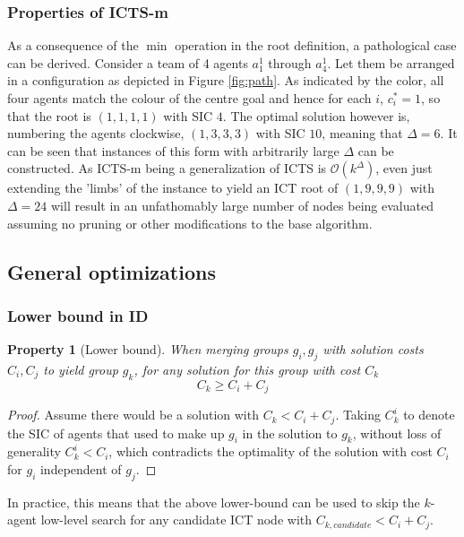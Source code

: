 \documentclass[english]{article}
\newtheorem{property}{Property}
\begin{document}
	\subsubsection{Properties of ICTS-m}
	As a consequence of the $\min$ operation in the root definition, a pathological case can be derived. Consider a team of 4 agents $a_1^1$ through $a_4^1$. Let them be arranged in a configuration as depicted in Figure \ref{fig:path}. As indicated by the color, all four agents match the colour of the centre goal and hence for each $i$, $c^*_i = 1$, so that the root is $(1,1,1,1)$ with SIC $4$. The optimal solution however is, numbering the agents clockwise, $(1,3,3,3)$ with SIC $10$, meaning that $\Delta = 6$. It can be seen that instances of this form with arbitrarily large $\Delta$ can be constructed. As ICTS-m being a generalization of ICTS is $\mathcal{O}(k^\Delta)$, even just extending the 'limbs' of the instance to yield an ICT root of $(1,9,9,9)$ with $\Delta = 24$ will result in an unfathomably large number of nodes being evaluated assuming no pruning or other modifications to the base algorithm.
	\subsection{General optimizations}
	\subsubsection{Lower bound in ID}
	\begin{property}[Lower bound]
		When merging groups $g_i,g_j$ with solution costs $C_i,C_j$ to yield group $g_k$, for any solution for this group with cost $C_k$
		\[C_k\geq C_i + C_j\]
	\end{property}
	\begin{proof}
		Assume there would be a solution with $C_k < C_i + C_j$. Taking $C_k^i$ to denote the SIC of agents that used to make up $g_i$ in the solution to $g_k$, without loss of generality $C_k^i < C_i$, which contradicts the optimality of the solution with cost $C_i$ for $g_i$ independent of $g_j$.
	\end{proof}
	In practice, this means that the above lower-bound can be used to skip the $k$-agent low-level search for any candidate ICT node with $C_{k,candidate}<C_i + C_j$.
	
\end{document}
